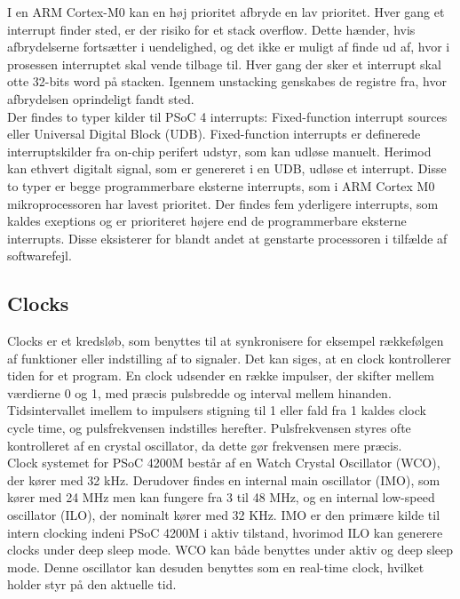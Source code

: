 I en ARM Cortex-M0 kan en høj prioritet afbryde en lav prioritet. Hver gang et interrupt finder sted, er der risiko for et stack overflow. Dette hænder, hvis afbrydelserne fortsætter i uendelighed, og det ikke er muligt af finde ud af, hvor i prosessen interruptet skal vende tilbage til. Hver gang der sker et interrupt skal otte 32-bits word på stacken. Igennem unstacking genskabes de registre fra, hvor afbrydelsen oprindeligt fandt sted.\\
Der findes to typer kilder til PSoC 4 interrupts: Fixed-function interrupt sources eller Universal Digital Block (UDB). Fixed-function interrupts er definerede interruptskilder fra on-chip perifert udstyr, som kan udløse manuelt. Herimod kan ethvert digitalt signal, som er genereret i en UDB, udløse et interrupt. Disse to typer er begge programmerbare eksterne interrupts, som i ARM Cortex M0 mikroprocessoren har lavest prioritet. Der findes fem yderligere interrupts, som kaldes exeptions og er prioriteret højere end de programmerbare eksterne interrupts. Disse eksisterer for blandt andet at genstarte processoren i tilfælde af softwarefejl. \citep{Badiger2016}

\subsection{Clocks}
Clocks er et kredsløb, som benyttes til at synkronisere for eksempel rækkefølgen af funktioner eller indstilling af to signaler. Det kan siges, at en clock kontrollerer tiden for et program. En clock udsender en række impulser, der skifter mellem værdierne 0 og 1, med præcis pulsbredde og interval mellem hinanden. Tidsintervallet imellem to impulsers stigning til 1 eller fald fra 1 kaldes clock cycle time, og pulsfrekvensen indstilles herefter. Pulsfrekvensen styres ofte kontrolleret af en crystal oscillator, da dette gør frekvensen mere præcis. \citep{Tanenbaum2006}\\
Clock systemet for PSoC 4200M består af en Watch Crystal Oscillator (WCO), der kører med 32 kHz. Derudover findes en internal main oscillator (IMO), som kører med 24 MHz men kan fungere fra 3 til 48 MHz, og en internal low-speed oscillator (ILO), der nominalt kører med 32 KHz. IMO er den primære kilde til intern clocking indeni PSoC 4200M i aktiv tilstand, hvorimod ILO kan generere clocks under deep sleep mode. WCO kan både benyttes under aktiv og deep sleep mode. Denne oscillator kan desuden benyttes som en real-time clock, hvilket holder styr på den aktuelle tid. \citep{Semiconductor20164200M}

